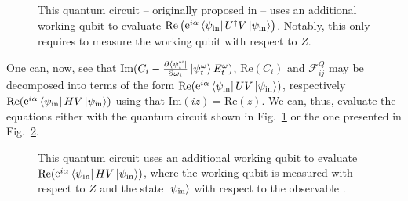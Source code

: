 \documentclass[twocolumn, aps, pra, superscriptaddress]{revtex4-1}
\DeclareMathOperator{\ee}{e}
\begin{document}
\begin{figure}[!htb]
\captionsetup{singlelinecheck = false, format= hang, justification=centerlast, font=footnotesize, labelsep=space}
\begin{center}
\end{center}
\caption{This quantum circuit -- originally proposed in \cite{LaflammeSimulatingPhysPhenom02} -- uses an additional working qubit to evaluate $\text{Re}\left(\ee^{i\alpha}\bra{\psi_{\text{in}}}U^{\dagger}V\ket{\psi_{\text{in}}}\right)$. Notably, this only requires to measure the working qubit with respect to $Z$.}
\label{fig:expValueCircuit}
\end{figure}


One can, now, see that
$\text{Im}(C_i -  \textstyle{\frac{\partial \bra{\psi^{\omega}_t}}{\partial \omega_i}\ket{\psi^{\omega}_t}E_t^{\omega})}$, $\text{Re}(C_i)$ and $
\mathcal{F}^Q_{ij}$ may be decomposed into terms of the form $
    \text{Re}(\ee^{i\alpha}\bra{\psi_{\text{in}}}UV\ket{\psi_{\text{in}}})$, respectively $    \text{Re}(\ee^{i\alpha}\bra{\psi_{\text{in}}}HV\ket{\psi_{\text{in}}})$
using that $\text{Im}(iz)=\text{Re}(z)$.
We can, thus, evaluate the equations either with the quantum circuit shown in Fig.~\ref{fig:expValueCircuit} or the one presented in Fig.~\ref{fig:expValueCircuitwithH}.

\begin{figure}[!htb]
\captionsetup{singlelinecheck = false, format= hang, justification=centerlast, font=footnotesize, labelsep=space}
\begin{center}
\end{center}
\caption{This quantum circuit uses an additional working qubit to evaluate $\text{Re}(\ee^{i\alpha}\bra{\psi_{\text{in}}}HV\ket{\psi_{\text{in}}})$, where the working qubit is measured with respect to $Z$ and the state $\ket{\psi_{\text{in}}}$ with respect to the observable .}
\label{fig:expValueCircuitwithH}
\end{figure}
\end{document}
